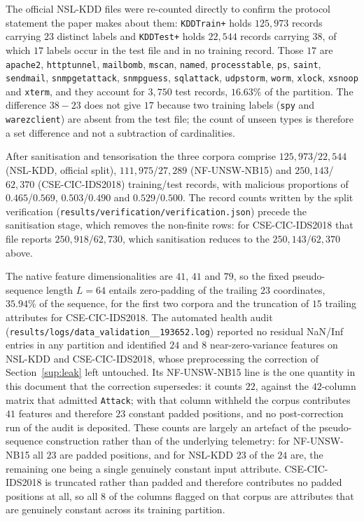 \documentclass[11pt,a4paper]{article}
\begin{document}
The official NSL-KDD files were re-counted directly to confirm the
protocol statement the paper makes about them: \texttt{KDDTrain+} holds
$125{,}973$ records carrying $23$ distinct labels and
\texttt{KDDTest+} holds $22{,}544$ records carrying $38$, of which $17$
labels occur in the test file and in no training record. Those $17$ are
\texttt{apache2}, \texttt{httptunnel}, \texttt{mailbomb},
\texttt{mscan}, \texttt{named}, \texttt{processtable}, \texttt{ps},
\texttt{saint}, \texttt{sendmail}, \texttt{snmpgetattack},
\texttt{snmpguess}, \texttt{sqlattack}, \texttt{udpstorm},
\texttt{worm}, \texttt{xlock}, \texttt{xsnoop} and \texttt{xterm},
and they account for $3{,}750$ test records, $16.63\%$ of the
partition. The difference $38-23$ does not give $17$ because two
training labels (\texttt{spy} and \texttt{warezclient}) are absent from
the test file; the count of unseen types is therefore a set difference
and not a subtraction of cardinalities.

After sanitisation and tensorisation the three corpora comprise
$125{,}973$/$22{,}544$ (NSL-KDD, official split),
$111{,}975$/$27{,}289$ (NF-UNSW-NB15) and $250{,}143$/$62{,}370$
(CSE-CIC-IDS2018) training/test records, with malicious proportions of
$0.465$/$0.569$, $0.503$/$0.490$ and $0.529$/$0.500$. The record counts
written by the split verification
(\texttt{results/verification/verification.json}) precede the
sanitisation stage, which removes the non-finite rows: for
CSE-CIC-IDS2018 that file reports $250{,}918$/$62{,}730$, which
sanitisation reduces to the $250{,}143$/$62{,}370$ above.

The native feature dimensionalities are $41$, $41$ and $79$, so the
fixed pseudo-sequence length $L=64$ entails zero-padding of the
trailing $23$ coordinates, $35.94\%$ of the sequence, for the first two
corpora and the truncation of $15$ trailing attributes for
CSE-CIC-IDS2018. The automated health audit
(\texttt{results/logs/\allowbreak data\_validation\_\_193652.log})
reported no residual NaN/Inf entries in any partition and identified
$24$ and $8$ near-zero-variance features on NSL-KDD and
CSE-CIC-IDS2018, whose preprocessing the correction of
Section~\ref{sup:leak} left untouched. Its NF-UNSW-NB15 line is the one
quantity in this document that the correction supersedes: it counts
$22$, against the $42$-column matrix that admitted \texttt{Attack};
with that column withheld the corpus contributes $41$ features and
therefore $23$ constant padded positions, and no post-correction run of
the audit is deposited. These counts are largely an artefact of the
pseudo-sequence construction rather than of the underlying telemetry:
for NF-UNSW-NB15 all $23$ are padded positions, and for NSL-KDD $23$ of
the $24$ are, the remaining one being a single genuinely constant input
attribute. CSE-CIC-IDS2018 is truncated rather
than padded and therefore contributes no padded positions at all, so
all $8$ of the columns flagged on that corpus are attributes that are
genuinely constant across its training partition.
\end{document}
